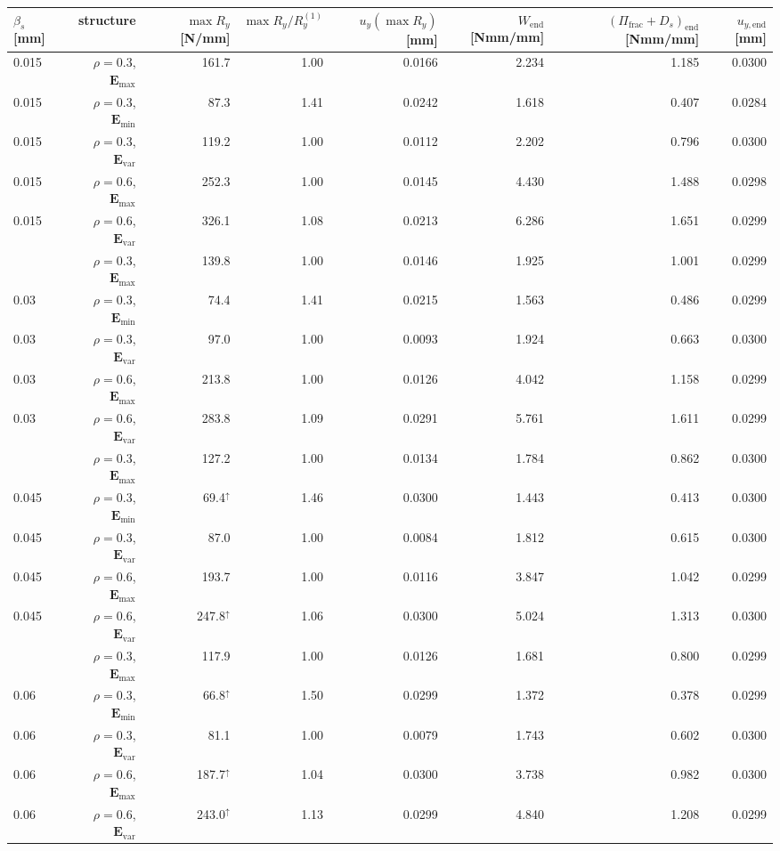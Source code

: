 \begin{tabular}{lrrrrrrr}
\toprule
$\beta_s$ [mm] & structure & $\max R_y$ [N/mm] & $\max R_y / R_y^{(1)}$ & $u_y(\max R_y)$ [mm] & $W_\mathrm{end}$ [Nmm/mm] & $(\Pi_\mathrm{frac}+D_s)_\mathrm{end}$ [Nmm/mm] & $u_{y,\mathrm{end}}$ [mm] \\
\midrule
0.015 & $\rho=0.3$, $\mathbf{E}_{\mathrm{max}}$ & 161.7 & 1.00 & 0.0166 & 2.234 & 1.185 & 0.0300 \\
0.015 & $\rho=0.3$, $\mathbf{E}_{\mathrm{min}}$ & 87.3 & 1.41 & 0.0242 & 1.618 & 0.407 & 0.0284 \\
0.015 & $\rho=0.3$, $\mathbf{E}_{\mathrm{var}}$ & 119.2 & 1.00 & 0.0112 & 2.202 & 0.796 & 0.0300 \\
0.015 & $\rho=0.6$, $\mathbf{E}_{\mathrm{max}}$ & 252.3 & 1.00 & 0.0145 & 4.430 & 1.488 & 0.0298 \\
0.015 & $\rho=0.6$, $\mathbf{E}_{\mathrm{var}}$ & 326.1 & 1.08 & 0.0213 & 6.286 & 1.651 & 0.0299 \\
\addlinespace
0.03 & $\rho=0.3$, $\mathbf{E}_{\mathrm{max}}$ & 139.8 & 1.00 & 0.0146 & 1.925 & 1.001 & 0.0299 \\
0.03 & $\rho=0.3$, $\mathbf{E}_{\mathrm{min}}$ & 74.4 & 1.41 & 0.0215 & 1.563 & 0.486 & 0.0299 \\
0.03 & $\rho=0.3$, $\mathbf{E}_{\mathrm{var}}$ & 97.0 & 1.00 & 0.0093 & 1.924 & 0.663 & 0.0300 \\
0.03 & $\rho=0.6$, $\mathbf{E}_{\mathrm{max}}$ & 213.8 & 1.00 & 0.0126 & 4.042 & 1.158 & 0.0299 \\
0.03 & $\rho=0.6$, $\mathbf{E}_{\mathrm{var}}$ & 283.8 & 1.09 & 0.0291 & 5.761 & 1.611 & 0.0299 \\
\addlinespace
0.045 & $\rho=0.3$, $\mathbf{E}_{\mathrm{max}}$ & 127.2 & 1.00 & 0.0134 & 1.784 & 0.862 & 0.0300 \\
0.045 & $\rho=0.3$, $\mathbf{E}_{\mathrm{min}}$ & 69.4$^{\uparrow}$ & 1.46 & 0.0300 & 1.443 & 0.413 & 0.0300 \\
0.045 & $\rho=0.3$, $\mathbf{E}_{\mathrm{var}}$ & 87.0 & 1.00 & 0.0084 & 1.812 & 0.615 & 0.0300 \\
0.045 & $\rho=0.6$, $\mathbf{E}_{\mathrm{max}}$ & 193.7 & 1.00 & 0.0116 & 3.847 & 1.042 & 0.0299 \\
0.045 & $\rho=0.6$, $\mathbf{E}_{\mathrm{var}}$ & 247.8$^{\uparrow}$ & 1.06 & 0.0300 & 5.024 & 1.313 & 0.0300 \\
\addlinespace
0.06 & $\rho=0.3$, $\mathbf{E}_{\mathrm{max}}$ & 117.9 & 1.00 & 0.0126 & 1.681 & 0.800 & 0.0299 \\
0.06 & $\rho=0.3$, $\mathbf{E}_{\mathrm{min}}$ & 66.8$^{\uparrow}$ & 1.50 & 0.0299 & 1.372 & 0.378 & 0.0299 \\
0.06 & $\rho=0.3$, $\mathbf{E}_{\mathrm{var}}$ & 81.1 & 1.00 & 0.0079 & 1.743 & 0.602 & 0.0300 \\
0.06 & $\rho=0.6$, $\mathbf{E}_{\mathrm{max}}$ & 187.7$^{\uparrow}$ & 1.04 & 0.0300 & 3.738 & 0.982 & 0.0300 \\
0.06 & $\rho=0.6$, $\mathbf{E}_{\mathrm{var}}$ & 243.0$^{\uparrow}$ & 1.13 & 0.0299 & 4.840 & 1.208 & 0.0299 \\
\bottomrule
\end{tabular}
